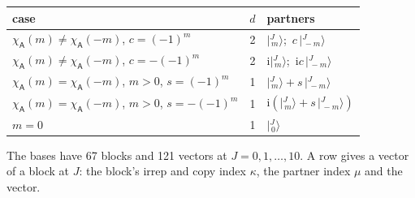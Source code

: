 \documentclass[10pt,a4paper]{article}
\numberwithin{equation}{section}
\newcommand{\grp}[1]{\mathsf{#1}}
\newcommand{\iunit}{\mathrm{i}}
\newcommand{\chiA}{\chi_{\grp{A}}}
\newcommand{\mult}{\kappa}
\newcommand{\intx}{\mu}
\newcommand{\jm}[2]{\bigl\lvert{}^{#1}_{\,#2}\bigr\rangle}
\begin{document}
\begin{center}\begin{tabular}{@{}lrl@{}}\toprule
case & $d$ & partners\\\midrule
$\chiA(m) \ne \chiA(-m)$, $c = (-1)^m$ & 2 & $\jm{J}{m}$;\ $c\,\jm{J}{-m}$\\
$\chiA(m) \ne \chiA(-m)$, $c = -(-1)^m$ & 2 & $\iunit\jm{J}{m}$;\ $\iunit c\,\jm{J}{-m}$\\
$\chiA(m) = \chiA(-m)$, $m > 0$, $s = (-1)^m$ & 1 & $\jm{J}{m} + s\,\jm{J}{-m}$\\
$\chiA(m) = \chiA(-m)$, $m > 0$, $s = -(-1)^m$ & 1 & $\iunit(\jm{J}{m} + s\,\jm{J}{-m})$\\
$m = 0$ & 1 & $\jm{J}{0}$\\
\bottomrule\end{tabular}\end{center}
The bases have 67 blocks and 121 vectors at $J = 0, 1, \dots, 10$. \label{n:head.vector}A row gives a vector of a block at $J$: the block's irrep and copy index $\mult$, the partner index $\intx$ and the vector.
\end{document}
